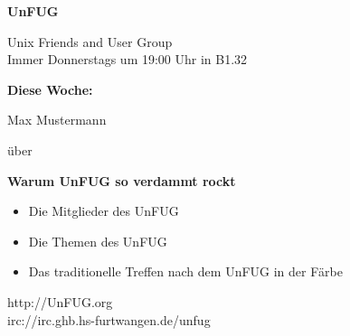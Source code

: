 \documentclass[
    headinclude=false,
    footinclude=false,
    paper=A4,
    paper=portrait,
    pagesize
]{scrartcl}
\newcommand{\referee}{Max Mustermann}
\newcommand{\thema}{Warum UnFUG so verdammt rockt}
\newcommand{\desc}{
    \begin{itemize}
        \item Die Mitglieder des UnFUG
        \item Die Themen des UnFUG
        \item Das traditionelle Treffen nach dem UnFUG in der Färbe
    \end{itemize}
}
\begin{document}
    \thispagestyle{empty}

    \begin{mdframed}[style=mdunfuggreen]
        \begin{center}
            \vspace{0.7cm}

            {\fontsize{80}{96} \selectfont \textbf{UnFUG}}

            \begin{Huge}
                \vspace{0.7cm}
                Unix Friends and User Group
                \vspace{0.7cm} \\
                Immer Donnerstags um 19:00 Uhr in B1.32
                \vspace{0.7cm}
            \end{Huge}

        \end{center}
    \end{mdframed}

    \begin{mdframed}[style=mdunfugblank]
        \begin{center}
            {\fontsize{40}{40} \selectfont \textbf{Diese Woche:}}

            \begin{Huge}
                \vspace{1cm}
                \referee

                \vspace{1cm}
                über

                \vspace{1cm}
                {\fontsize{40}{40} \selectfont \textbf{\thema}}

                \vspace{1cm}
                \desc
            \end{Huge}

        \end{center}
    \end{mdframed}

    \vfill{}

    \begin{mdframed}[style=mdunfugblank]
        \begin{center}
            \begin{huge}
                http://UnFUG.org \\
                irc://irc.ghb.hs-furtwangen.de/unfug
            \end{huge}
        \end{center}
    \end{mdframed}
\end{document}

